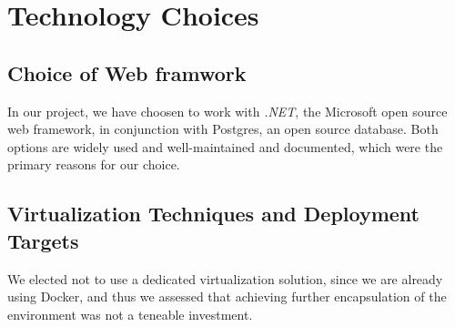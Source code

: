
\section{Technology Choices}

\subsection{Choice of Web framwork}
In our project, we have choosen to work with \textit{.NET}, the Microsoft open source web framework, in conjunction with Postgres, an open source database.
Both options are widely used and well-maintained and documented, which were the primary reasons for our choice.



\subsection{Virtualization Techniques and Deployment Targets}

We elected not to use a dedicated virtualization solution,
since we are already using Docker, and thus we assessed that achieving further encapsulation of the environment was not a teneable investment.

